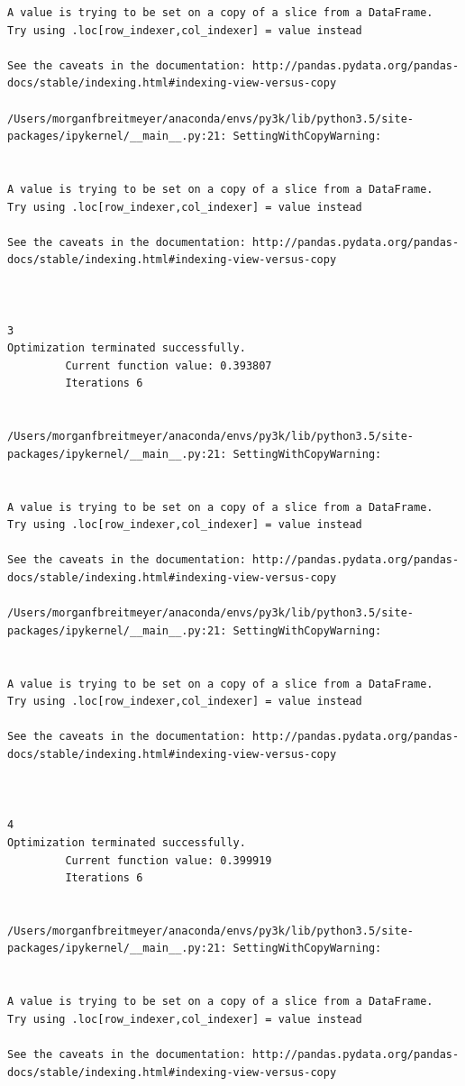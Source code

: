 \begin{lstlisting}
A value is trying to be set on a copy of a slice from a DataFrame.
Try using .loc[row_indexer,col_indexer] = value instead

See the caveats in the documentation: http://pandas.pydata.org/pandas-docs/stable/indexing.html#indexing-view-versus-copy

/Users/morganfbreitmeyer/anaconda/envs/py3k/lib/python3.5/site-packages/ipykernel/__main__.py:21: SettingWithCopyWarning:


A value is trying to be set on a copy of a slice from a DataFrame.
Try using .loc[row_indexer,col_indexer] = value instead

See the caveats in the documentation: http://pandas.pydata.org/pandas-docs/stable/indexing.html#indexing-view-versus-copy



3
Optimization terminated successfully.
         Current function value: 0.393807
         Iterations 6


/Users/morganfbreitmeyer/anaconda/envs/py3k/lib/python3.5/site-packages/ipykernel/__main__.py:21: SettingWithCopyWarning:


A value is trying to be set on a copy of a slice from a DataFrame.
Try using .loc[row_indexer,col_indexer] = value instead

See the caveats in the documentation: http://pandas.pydata.org/pandas-docs/stable/indexing.html#indexing-view-versus-copy

/Users/morganfbreitmeyer/anaconda/envs/py3k/lib/python3.5/site-packages/ipykernel/__main__.py:21: SettingWithCopyWarning:


A value is trying to be set on a copy of a slice from a DataFrame.
Try using .loc[row_indexer,col_indexer] = value instead

See the caveats in the documentation: http://pandas.pydata.org/pandas-docs/stable/indexing.html#indexing-view-versus-copy



4
Optimization terminated successfully.
         Current function value: 0.399919
         Iterations 6


/Users/morganfbreitmeyer/anaconda/envs/py3k/lib/python3.5/site-packages/ipykernel/__main__.py:21: SettingWithCopyWarning:


A value is trying to be set on a copy of a slice from a DataFrame.
Try using .loc[row_indexer,col_indexer] = value instead

See the caveats in the documentation: http://pandas.pydata.org/pandas-docs/stable/indexing.html#indexing-view-versus-copy


\end{lstlisting}
